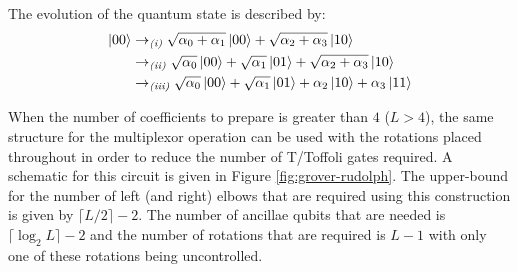 The evolution of the quantum state is described by:
\begin{equation}
    \begin{split}
        \ket{00} &\rightarrow_{\textit{(i)}} \sqrt{\alpha_0 + \alpha_1} \ket{00} + \sqrt{\alpha_2 + \alpha_3} \ket{10} \\
        &\rightarrow_{\textit{(ii)}} \sqrt{\alpha_0} \ket{00} + \sqrt{\alpha_1} \ket{01} + \sqrt{\alpha_2 + \alpha_3} \ket{10} \\
        &\rightarrow_{\textit{(iii)}} \sqrt{\alpha_0} \ket{00} + \sqrt{\alpha_1} \ket{01} + \alpha_2 \ket{10} + \alpha_3 \ket{11}
    \end{split}
\end{equation}

When the number of coefficients to prepare is greater than $4$ ($L > 4$), the same structure for the multiplexor operation can be used with the rotations placed throughout in order to reduce the number of T/Toffoli gates required.
A schematic for this circuit is given in Figure \ref{fig:grover-rudolph}. 
The upper-bound for the number of left (and right) elbows that are required using this construction is given by $\lceil L / 2 \rceil - 2$. 
The number of ancillae qubits that are needed is $\lceil \log_2{L} \rceil - 2$ and the number of rotations that are required is $L - 1$ with only one of these rotations being uncontrolled.

